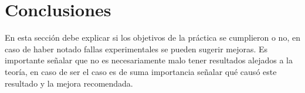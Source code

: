 \section{Conclusiones}
\label{sec:Conclusión}

En esta sección debe explicar si los objetivos de la práctica se cumplieron o no, en caso de haber notado fallas experimentales se pueden sugerir mejoras. Es importante señalar que no es necesariamente malo tener resultados alejados a la teoría, en caso de ser el caso es de suma importancia señalar qué causó este resultado y la mejora recomendada.